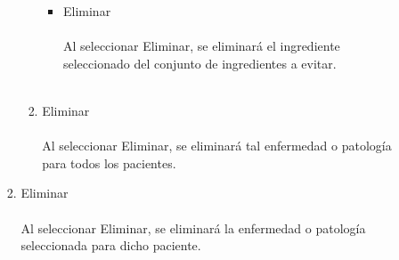 \documentclass[12pt, spanish]{article}
\begin{document}
\begin{enumerate}
\begin{enumerate}
\begin{enumerate}
\begin{enumerate}
\begin{itemize}
\item Eliminar\\\\
Al seleccionar Eliminar, se eliminará el ingrediente seleccionado del conjunto de ingredientes a evitar.\\\\
\end{itemize}
\item Eliminar\\\\
Al seleccionar Eliminar, se eliminará tal enfermedad o patología para todos los pacientes.\\
\end{enumerate}
\item Eliminar\\\\
Al seleccionar Eliminar, se eliminará la enfermedad o patología seleccionada para dicho paciente.\\
\end{enumerate}
\end{enumerate}
\end{enumerate}
\end{document}
